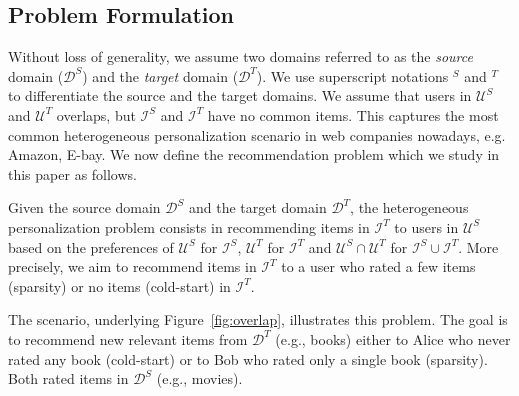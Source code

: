 \subsection{Problem Formulation}
Without loss of generality, we assume two domains referred to as the {\textit{source}} domain ($\mathcal{D}^S$) and the {\textit{target}} domain ($\mathcal{D}^T$). 
We use superscript notations $^S$ and $^T$ to differentiate the source and the target
domains. We assume that users in $\mathcal{U}^S$ and $\mathcal{U}^T$ overlaps, but $\mathcal{I}^S$ and $\mathcal{I}^T$ have no common items. This captures the most common heterogeneous personalization scenario in web companies nowadays, e.g. Amazon, E-bay. We now define the recommendation problem which we study in this paper as follows.
\begin{definition}
Given the source domain $\mathcal{D}^S$ and the target domain $\mathcal{D}^T$, the heterogeneous personalization problem consists in recommending items in $\mathcal{I}^T$ to users in $\mathcal{U}^S$ based on the preferences of $\mathcal{U}^S$ for $\mathcal{I}^S$, $\mathcal{U}^T$ for $\mathcal{I}^T$ and $\mathcal{U}^S \cap \mathcal{U}^T$ for $\mathcal{I}^S \cup \mathcal{I}^T$. More precisely, we aim to recommend items in $\mathcal{I}^T$ to a user who rated a few items (sparsity) or no items (cold-start) in $\mathcal{I}^T$.
\end{definition}

The scenario, underlying Figure~\ref{fig:overlap}, illustrates this problem. The goal is to recommend new relevant items from $\mathcal{D}^T$ (e.g., books) either to Alice who never rated any book (cold-start) or to Bob who rated only a single book (sparsity). Both rated items in $\mathcal{D}^S$ (e.g., movies).
